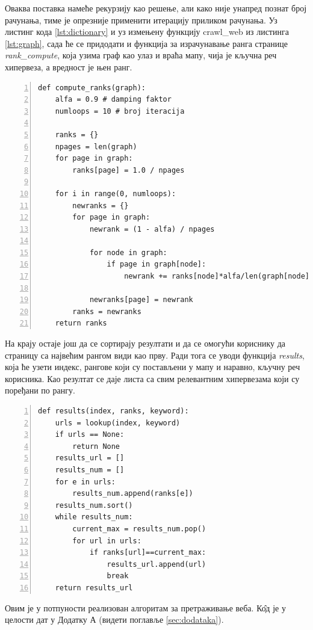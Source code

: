 Оваква поставка намеће рекурзију као решење, али како није унапред познат број рачунања, тиме је опрезније применити итерацију приликом рачунања. Уз листинг кода \ref{lst:dictionary} и уз измењену функцију crawl\_web из листинга \ref{lst:graph}, сада ће се придодати и функција за израчунавање ранга странице \emph{rank\_compute}, која узима граф као улаз и враћа мапу, чија је кључна реч хипервеза, а вредност је њен ранг.

\begin{lstlisting}[caption=Израчунавање ранга странице, label={lst:rank}, numbers=left]
def compute_ranks(graph):
    alfa = 0.9 # damping faktor
    numloops = 10 # broj iteracija

    ranks = {}
    npages = len(graph)
    for page in graph:
        ranks[page] = 1.0 / npages

    for i in range(0, numloops):
        newranks = {}
        for page in graph:
            newrank = (1 - alfa) / npages

            for node in graph:
                if page in graph[node]:
                    newrank += ranks[node]*alfa/len(graph[node])

            newranks[page] = newrank
        ranks = newranks
    return ranks
\end{lstlisting}

На крају остаје још да се сортирају резултати и да се омогући кориснику да страницу са највећим рангом види као прву. Ради тога се уводи функција \emph{results}, која ће узети индекс, рангове који су постављени у мапу и наравно, кључну реч корисника. Као резултат се даје листа са свим релевантним хипервезама који су поређани по рангу.

\begin{lstlisting}[caption=Функција која враћа најбољи резултат, label={lst:results}, numbers=left]
def results(index, ranks, keyword):
    urls = lookup(index, keyword)
    if urls == None:
        return None
    results_url = []
    results_num = []
    for e in urls:
        results_num.append(ranks[e])
    results_num.sort()
    while results_num:
        current_max = results_num.pop()
        for url in urls:
            if ranks[url]==current_max:
                results_url.append(url)
                break
    return results_url

\end{lstlisting}

Овим је у потпуности реализован алгоритам за претраживање веба. К\^{о}д је у целости дат у Додатку А (видети поглавље \ref{sec:dodataka}).
